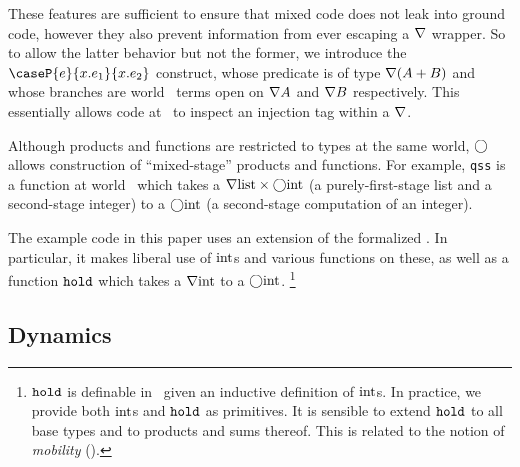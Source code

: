 \begin{abstrsyn}
These features are sufficient to ensure that mixed code does not leak into ground code,
however they also prevent information from ever escaping a $\nabla$ wrapper.
So to allow the latter behavior but not the former, we introduce the $\caseP{e}{x.e_1}{x.e_2}$ construct, 
whose predicate is of type $\nabla(A+B)$ and
whose branches are world \bbonem\ terms open on $\nabla{A}$ and $\nabla{B}$ respectively. 
This essentially allows code at \bbonem\ to inspect an injection tag within a $\nabla$.

Although products and functions are restricted to types at the same world,
$\bigcirc$ allows construction of ``mixed-stage'' products and functions.
For example, \texttt{qss} is a function at world \bbonem\ which takes a
$\nabla{\rm list} \times \bigcirc{\rm int}$ (a purely-first-stage list and a
second-stage integer) to a $\bigcirc{\rm int}$ (a second-stage
computation of an integer).

The example code in this paper uses an extension of the formalized \lang.
In particular, it makes liberal use of ${\rm int}$s and various
functions on these, as well as a function ${\tt hold}$ which takes a $\nabla{\rm int}$
to a $\bigcirc{\rm int}$.%
\footnote{${\tt hold}$ is definable in \lang\ given an inductive definition of
${\rm int}$s. In practice, we provide both ${\rm int}$s and ${\tt hold}$ as primitives.
It is sensible to extend ${\tt hold}$ to all base types and to products and sums
thereof. This is related to the notion of {\em mobility} (\cite{murphy05}).}

\end{abstrsyn}


\subsection{Dynamics}
\label{sec:dynamics}

